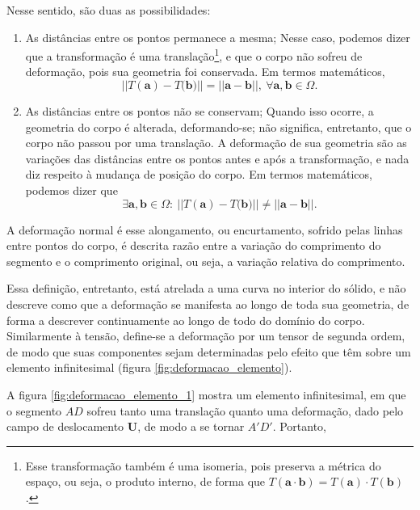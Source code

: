 Nesse sentido, são duas as possibilidades:
\begin{enumerate}
    \item As distâncias entre os pontos permanece a mesma;
        Nesse caso, podemos dizer que a transformação é uma translação\footnote{Esse transformação também é uma isomeria, pois preserva a métrica do espaço, ou seja, o produto interno, de forma que $ T(\bm{a} \cdot \bm{b}) = T(\bm{a}) \cdot T(\bm{b}) $.}, e que o corpo não sofreu de deformação, pois sua geometria foi conservada. Em termos matemáticos,
        \begin{equation}
            ||{T(\bm{a}) - T(\bm{b}})|| = ||{\bm{a} - \bm{b}}||, \ \forall \bm{a}, \bm{b} \in \Omega. 
        \end{equation}        
    \item As distâncias entre os pontos não se conservam;
        Quando isso ocorre, a geometria do corpo é alterada, deformando-se; não significa, entretanto, que o corpo não passou por uma translação. A deformação de sua geometria são as variações das distâncias entre os pontos antes e após a transformação, e nada diz respeito à mudança de posição do corpo. Em termos matemáticos, podemos dizer que
        \begin{equation}
             \exists \bm{a}, \bm{b} \in \Omega : \ ||{T(\bm{a}) - T(\bm{b}})|| \neq ||{\bm{a} - \bm{b}}||.
        \end{equation}
\end{enumerate}


A deformação normal é esse alongamento, ou encurtamento, sofrido pelas linhas entre pontos do corpo, é descrita razão entre a variação do comprimento do segmento e o comprimento original, ou seja, a variação relativa do comprimento.  

Essa definição, entretanto, está atrelada a uma curva no interior do sólido, e não descreve como que a deformação se manifesta ao longo de toda sua geometria, de forma a descrever continuamente ao longo de todo do domínio do corpo. Similarmente à tensão, define-se a deformação por um tensor de segunda ordem, de modo que suas componentes sejam determinadas pelo efeito que têm sobre um elemento infinitesimal (figura \ref{fig:deformacao_elemento}). \cite[pág. 230]{lub}

A figura \ref{fig:deformacao_elemento_1} mostra um elemento infinitesimal, em que o segmento $AD$ sofreu tanto uma translação quanto uma deformação, dado pelo campo de deslocamento $\bm{U}$, de modo a se tornar $A'D'$. Portanto,

